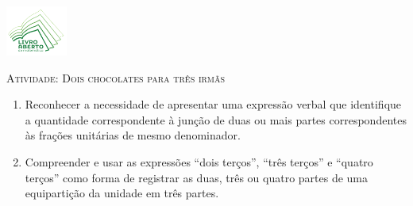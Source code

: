 \documentclass[10 pt,usenames,dvipsnames, oneside]{article}
\begin{document}
\begin{center}
  \begin{minipage}[l]{3cm}
\includegraphics[width=2cm]{logo}    
\end{minipage}\hfill
\begin{minipage}[r]{.8\textwidth}
 {\Large \scshape Atividade: Dois chocolates para três irmãs}  
\end{minipage}
\end{center}
\vspace{.2cm}

\ifdefined\prof
\begin{goals}
\begin{enumerate}

\item Reconhecer a necessidade de apresentar uma expressão verbal que identifique a quantidade correspondente à junção de duas ou mais partes correspondentes às frações unitárias de mesmo denominador.

\item Compreender e usar as expressões ``dois terços'', ``três terços'' e ``quatro terços'' como forma de registrar as duas, três ou quatro partes de uma equipartição da unidade em três partes.

\end{enumerate}
\tcblower


\end{goals}
\end{document}
